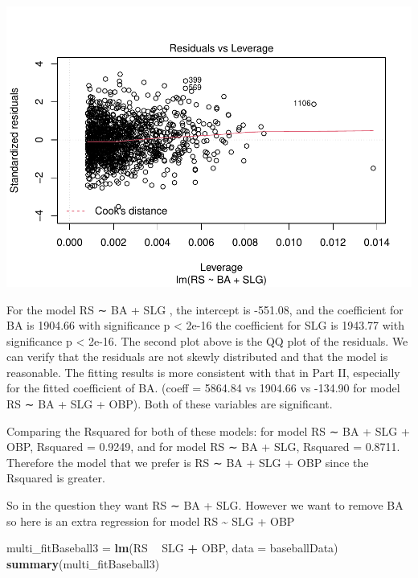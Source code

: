\documentclass[
]{article}
\newenvironment{Shaded}{\begin{snugshade}}{\end{snugshade}}
\newcommand{\DataTypeTok}[1]{\textcolor[rgb]{0.13,0.29,0.53}{#1}}
\newcommand{\KeywordTok}[1]{\textcolor[rgb]{0.13,0.29,0.53}{\textbf{#1}}}
\newcommand{\NormalTok}[1]{#1}
\newcommand{\OperatorTok}[1]{\textcolor[rgb]{0.81,0.36,0.00}{\textbf{#1}}}
\newcommand{\StringTok}[1]{\textcolor[rgb]{0.31,0.60,0.02}{#1}}
\begin{document}
\includegraphics{HW2_Liu-Zi-Jian_files/figure-latex/unnamed-chunk-40-4.pdf}

For the model RS ∼ BA + SLG , the intercept is -551.08, and the
coefficient for BA is 1904.66 with significance p \textless{} 2e-16 the
coefficient for SLG is 1943.77 with significance p \textless{} 2e-16.
The second plot above is the QQ plot of the residuals. We can verify
that the residuals are not skewly distributed and that the model is
reasonable. The fitting results is more consistent with that in Part II,
especially for the fitted coefficient of BA. (coeff = 5864.84 vs 1904.66
vs -134.90 for model RS ∼ BA + SLG + OBP). Both of these variables are
significant.

Comparing the Rsquared for both of these models: for model RS ∼ BA + SLG
+ OBP, Rsquared = 0.9249, and for model RS ∼ BA + SLG, Rsquared =
0.8711. Therefore the model that we prefer is RS ∼ BA + SLG + OBP since
the Rsquared is greater.

So in the question they want RS ∼ BA + SLG. However we want to remove BA
so here is an extra regression for model RS \textasciitilde{} SLG + OBP

\begin{Shaded}
\begin{Highlighting}[]
\NormalTok{multi_fitBaseball3 =}\StringTok{ }\KeywordTok{lm}\NormalTok{(RS }\OperatorTok{~}\StringTok{ }\NormalTok{SLG }\OperatorTok{+}\StringTok{ }\NormalTok{OBP, }\DataTypeTok{data =}\NormalTok{ baseballData)}
\KeywordTok{summary}\NormalTok{(multi_fitBaseball3)}
\end{Highlighting}
\end{Shaded}
\end{document}
